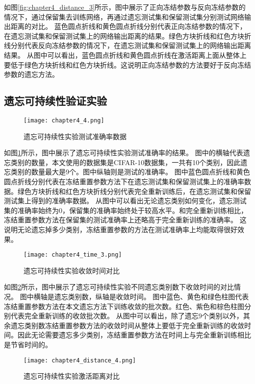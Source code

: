 如图\ref{fig:chapter4_distance_3}所示，图中展示了正向冻结参数与反向冻结参数的情况下，通过保留集去训练网络，再通过遗忘测试集和保留测试集分别测试网络输出距离的对比。
蓝色圆点折线和黄色圆点折线分别代表正向冻结参数的情况下，在遗忘测试集和保留测试集上的网络输出距离的结果。绿色方块折线和红色方块折线分别代表反向冻结参数的情况下，在遗忘测试集和保留测试集上的网络输出距离结果。
从图中可以看出，蓝色圆点折线和黄色圆点折线在激活距离上面从整体上要低于绿色方块折线和红色方块折线。这说明正向冻结参数的方法要好于反向冻结参数的遗忘方法。
\subsection{遗忘可持续性验证实验}
\begin{figure}
    \centering
    \texttt{[image: chapter4\_4.png]}
    \caption{遗忘可持续性实验测试准确率数据}
    \label{fig:chapter4_4}
\end{figure}

如图\ref{fig:chapter4_4}所示，图中展示了遗忘可持续性实验测试准确率的结果。
图中的横轴代表遗忘类别的数量，本文使用的数据集是CIFAR-10数据集，一共有10个类别，因此遗忘类别的数量最大是9个。图中纵轴则是测试的准确率。
图中蓝色圆点折线和黄色圆点折线分别代表在冻结重置参数方法下在遗忘测试集和保留测试集上的准确率数据。绿色方块折线和红色方块折线分别代表完全重新训练后，在遗忘测试集和保留测试集上得到的准确率数据。
从图中可以看出无论遗忘类别如何变化，遗忘测试集的准确率始终为0，保留集的准确率始终处于较高水平。和完全重新训练相比，冻结重置参数方法在保留集的测试准确率上还略高于完全重新训练的准确率。
这说明无论遗忘掉多少类别，冻结重置参数的方法在测试准确率上均能取得很好效果。

\begin{figure}
    \centering
    \texttt{[image: chapter4\_time\_3.png]}
    \caption{遗忘可持续性实验收敛时间对比}
    \label{fig:chapter4_time_3}
\end{figure}

如图\ref{fig:chapter4_time_3}所示，图中展示了遗忘可持续性实验不同遗忘类别数下收敛时间的对比情况。
图中横轴是遗忘类别数，纵轴是收敛时间。
图中蓝色、黄色和绿色柱图代表冻结重置参数方法在本文遗忘方法下训练收敛的批次数。红色、紫色和棕色柱图分别代表完全重新训练的收敛批次数。
从图中可以看出，除了遗忘9个类别以外，其余遗忘类别数冻结重置参数方法的收敛时间从整体上要低于完全重新训练的收敛时间。因此无论需要遗忘多少类别，冻结重置参数方法在时间上与完全重新训练相比是节省时间的。

\begin{figure}
    \centering
    \texttt{[image: chapter4\_distance\_4.png]}
    \caption{遗忘可持续性实验激活距离对比}
    \label{fig:chapter4_distance_4}
\end{figure}

